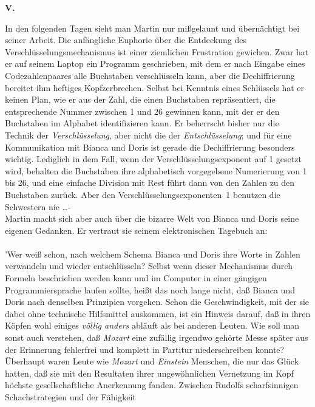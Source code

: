 \begin{center}
{\bf V.}
\end{center}
In den folgenden Tagen sieht man Martin nur mi{\ss}gelaunt und \"ubern\"achtigt
bei seiner Arbeit. Die anf\"angliche Euphorie \"uber die Entdeckung des
Verschl\"usselungsmechanismus ist einer ziemlichen Frustration gewichen. Zwar
hat er auf seinem Laptop ein Programm geschrieben, mit dem er nach Eingabe
eines Codezahlenpaares alle Buchstaben verschl\"usseln kann, aber die
Dechiffrierung bereitet ihm heftiges Kopfzerbrechen. Selbst bei Kenntnis eines
Schl\"ussels hat er keinen Plan, wie er aus der Zahl, die einen Buchstaben
repr\"asentiert, die entsprechende Nummer zwischen 1 und 26 gewinnen kann,
mit der er den Buchstaben im Alphabet identifizieren kann. Er beherrscht
bisher nur die Technik der {\em Verschl\"usselung\/}, aber nicht die der
{\em Entschl\"usselung\/}; und f\"ur eine Kommunikation mit Bianca und Doris
ist gerade die Dechiffrierung besonders wichtig. Lediglich in dem Fall, wenn
der Verschl\"usselungsexponent auf 1 gesetzt wird, behalten die Buchstaben
ihre alphabetisch vorgegebene Numerierung von 1 bis 26, und eine einfache
Division mit Rest f\"uhrt dann von den Zahlen zu den Buchstaben zur\"uck. Aber
den Verschl\"usselungsexponenten~1 benutzen die Schwestern nie \dots - \\
Martin macht sich aber auch \"uber die bizarre Welt von Bianca und Doris
seine eigenen Gedanken. Er vertraut sie seinem elektronischen Tagebuch an:
\\ \\
'Wer wei{\ss} schon, nach welchem Schema Bianca und Doris ihre Worte in Zahlen
verwandeln und wieder entschl\"usseln? Selbst wenn dieser Mechanismus durch
Formeln beschrieben werden kann und im Computer in einer g\"angigen
Programmiersprache laufen sollte, hei{\ss}t das noch lange nicht, da{\ss}
Bianca und Doris nach denselben Prinzipien vorgehen. Schon die Geschwindigkeit,
mit der sie dabei ohne technische Hilfsmittel auskommen, ist ein Hinweis
darauf, da{\ss} in ihren K\"opfen wohl einiges {\em v\"ollig anders\/}
abl\"auft als bei anderen Leuten. Wie soll man sonst auch verstehen, da{\ss}
{\em Mozart\/} eine zuf\"allig irgendwo geh\"orte Messe sp\"ater aus der
Erinnerung fehlerfrei und komplett in Partitur niederschreiben konnte?
\"Uberhaupt waren Leute wie {\em Mozart\/} und {\em Einstein\/} Menschen,
die nur das Gl\"uck hatten, da{\ss} sie mit den Resultaten ihrer
ungew\"ohnlichen Vernetzung im Kopf h\"ochste gesellschaftliche Anerkennung
fanden. Zwischen Rudolfs scharfsinnigen Schachstrategien und der F\"ahigkeit
